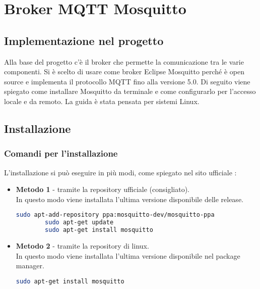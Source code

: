 
\chapter{Broker MQTT Mosquitto}
\label{ch:broker-mqtt}

\section{Implementazione nel progetto}
\label{sec:broker-introduzione}
Alla base del progetto c'è il broker che permette la comunicazione tra le varie componenti.
Si è scelto di usare come broker Eclipse Mosquitto perché è open source e implementa il protocollo MQTT fino alla versione 5.0.
Di seguito viene spiegato come installare Mosquitto da terminale e come configurarlo per l'accesso locale e da remoto.
La guida è stata pensata per sistemi Linux.

\section{Installazione}
\label{sec:broker-installazione}

\subsection{Comandi per l'installazione}
L'installazione si può eseguire in più modi, come spiegato nel sito ufficiale \cite{mosquitto-install}:

\begin{itemize}
    \item \textbf{Metodo 1} - tramite la repository ufficiale (consigliato).\\
    In questo modo viene installata l'ultima versione disponibile delle release.
    \begin{lstlisting}[language=bash]
        sudo apt-add-repository ppa:mosquitto-dev/mosquitto-ppa
        sudo apt-get update
        sudo apt-get install mosquitto
    \end{lstlisting}
    \item \textbf{Metodo 2} - tramite la repository di linux.\\
    In questo modo viene installata l'ultima versione disponibile nel package manager.
    \begin{lstlisting}[language=bash]
        sudo apt-get install mosquitto
    \end{lstlisting}
\end{itemize}

